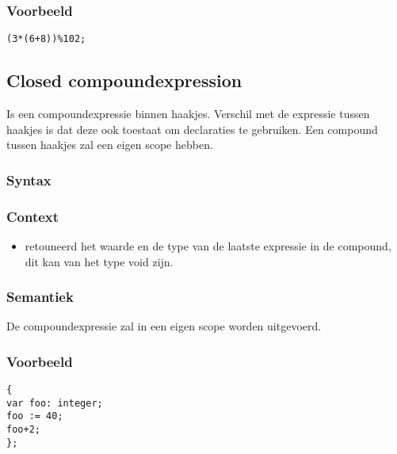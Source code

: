 \documentclass[]{article}
\begin{document}
\subsubsection{Voorbeeld}
\begin{lstlisting}[style=SELMA]
(3*(6+8))%102;
\end{lstlisting}

\subsection{Closed compoundexpression}
Is een compoundexpressie binnen haakjes. Verschil met de expressie tussen haakjes is dat deze ook toestaat om declaraties te gebruiken. Een compound tussen haakjes zal een eigen scope hebben.
\subsubsection{Syntax}

\subsubsection{Context}
\begin{itemize}
\item retouneerd het waarde en de type van de laatste expressie in de compound, dit kan van het type void zijn.
\end{itemize}
\subsubsection{Semantiek}
De compoundexpressie zal in een eigen scope worden uitgevoerd.
\subsubsection{Voorbeeld}
\begin{lstlisting}[style=SELMA]
{
var foo: integer;
foo := 40;
foo+2;
};
\end{lstlisting}



%
%


\end{document}
